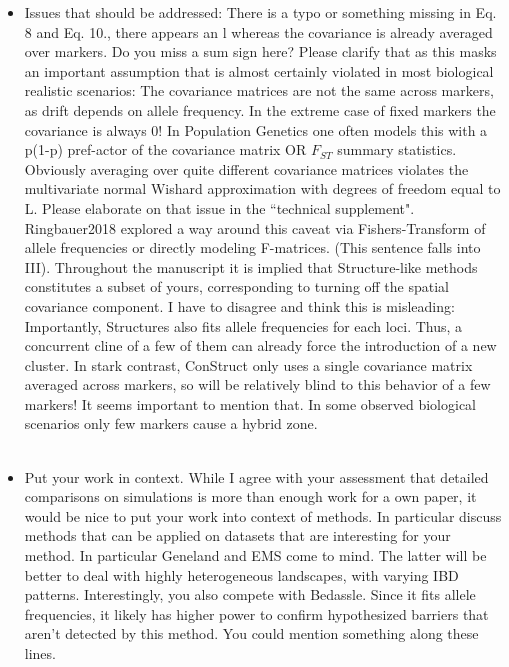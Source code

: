 \documentclass[11pt]{letter}
\newcommand{\gb}[1]{{\bf\color{black}{#1}}}
\begin{document}
\begin{itemize}
\item Issues that should be addressed:
 There is a typo or something missing in Eq. 8 and Eq. 10., 
 there appears an l whereas the covariance is already averaged over markers. 
 Do you miss a sum sign here? 
 Please clarify that as this masks an important assumption 
 that is almost certainly violated in most biological realistic scenarios:
The covariance matrices are not the same across markers, 
as drift depends on allele frequency. 
In the extreme case of fixed markers the covariance is always 0! 
In Population Genetics one often models this with a p(1-p) 
pref-actor of the covariance matrix OR $F_{ST}$ summary statistics. 
Obviously averaging over quite different covariance matrices 
violates the multivariate normal Wishard approximation with 
degrees of freedom equal to L. 
Please elaborate on that issue in the ``technical supplement".
Ringbauer2018 explored a way around this caveat via Fishers-Transform of allele
frequencies or directly modeling F-matrices. (This sentence falls into III).
 Throughout the manuscript it is implied that Structure-like methods constitutes a subset of yours, 
 corresponding to turning off the spatial covariance component. 
 I have to disagree and think this is misleading: 
 Importantly, Structures also fits allele frequencies for each loci. 
 Thus, a concurrent cline of a few of them can already force the introduction of a new cluster. 
 In stark contrast, ConStruct only uses a single covariance matrix averaged across markers, 
 so will be relatively blind to this behavior of a few markers! 
 It seems important to mention that. 
 In some observed biological scenarios only few markers cause a hybrid zone.\\\\
\gb{RESPONSE.}

\item Put your work in context. 
 While I agree with your assessment that detailed comparisons on simulations is more than enough work for a own paper, 
 it would be nice to put your work into context of methods. 
 In particular discuss methods that can be applied on datasets that are interesting for your method. 
 In particular Geneland and EMS come to mind. 
 The latter will be better to deal with highly heterogeneous landscapes, with varying IBD patterns.
Interestingly, you also compete with Bedassle. 
Since it fits allele frequencies, it likely has higher power to confirm 
hypothesized barriers that aren't detected by this method. 
You could mention something along these lines.\\\\
\gb{RESPONSE.}


\end{itemize}
\end{document}
